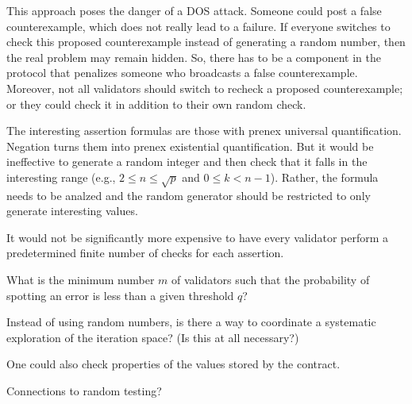 \documentclass{article}
\begin{document}
This approach poses the danger of a DOS attack. Someone could post a false
counterexample, which does not really lead to a failure. If everyone switches to check
this proposed counterexample instead of generating a random number, then the real
problem may remain hidden. So, there has to be a component in the protocol that
penalizes someone who broadcasts a false counterexample. Moreover, not all validators
should switch to recheck a proposed counterexample; or they could check it in addition
to their own random check.

The interesting assertion formulas are those with prenex universal
quantification. Negation turns them into prenex existential quantification. But it
would be ineffective to generate a random integer and then check that it falls in the
interesting range (e.g., $2\le n \le \sqrt p$ and $0\le k< n-1$). Rather, the formula
needs to be analzed and the random generator should be restricted to only generate
interesting values. 

It would not be significantly more expensive to have every validator perform a
predetermined finite number of checks for each assertion.

What is the minimum number $m$ of validators such that the probability of spotting an
error is less than a given threshold $q$?

Instead of using random numbers, is there a way to coordinate a systematic exploration
of the iteration space? (Is this at all necessary?)

One could also check properties of the values stored by the contract.

Connections to random testing?
\end{document}

